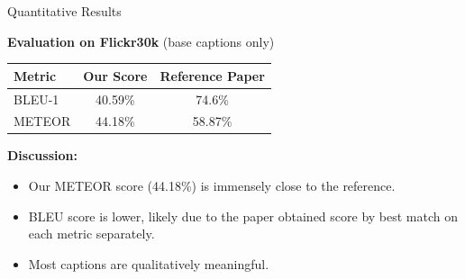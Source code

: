 \documentclass{beamer}
\begin{document}
\begin{frame}{Quantitative Results}

    \textbf{Evaluation on Flickr30k} (base captions only)

    \vspace{0.4cm}
    \begin{center}
    \begin{tabular}{lcc}
    \toprule
    \textbf{Metric} & \textbf{Our Score} & \textbf{Reference Paper} \\
    \midrule
    BLEU-1  & 40.59\% & 74.6\% \\
    METEOR  & 44.18\% & 58.87\% \\
    \bottomrule
    \end{tabular}
    \end{center}

    \vspace{0.4cm}
    \textbf{Discussion:}
    \begin{itemize}
        \item Our METEOR score (44.18\%) is immensely close to the reference.
        \item BLEU score is lower, likely due to the paper obtained score by best match on each metric separately.
        \item Most captions are qualitatively meaningful. 
    \end{itemize}

\end{frame}
\end{document}
